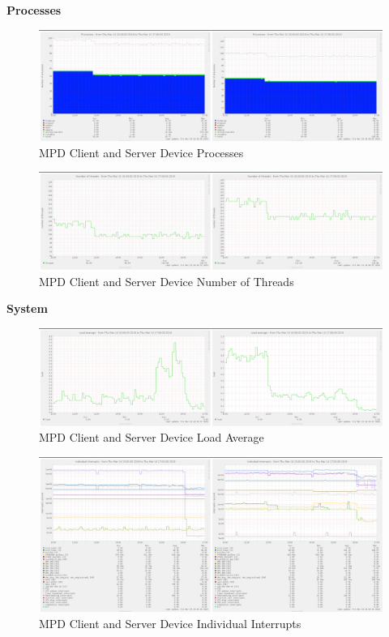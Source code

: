 \documentclass[11pt,a4paper,headinclude=false,footinclude=false]{scrreprt}
\begin{document}
\textbf{Processes}

\begin{figure}[H]
\includegraphics{ResultsAndAnalysis/MPDServerTestImages/019MPDProcesses.png}
\centering
\caption{MPD Client and Server Device Processes}
\label{MPDProcesses}
\end{figure}

\begin{figure}[H]
\includegraphics{ResultsAndAnalysis/MPDServerTestImages/018MPDNoOfThreads.png}
\centering
\caption{MPD Client and Server Device Number of Threads}
\label{MPDNumThreads}
\end{figure}

\textbf{System}

\begin{figure}[H]
\includegraphics{ResultsAndAnalysis/MPDServerTestImages/015MPDLoadAverage.png}
\centering
\caption{MPD Client and Server Device Load Average}
\label{MPDLoadAvg}
\end{figure}

\begin{figure}[H]
\includegraphics{ResultsAndAnalysis/MPDServerTestImages/013MPDIndividualInterrupts.png}
\centering
\caption{MPD Client and Server Device Individual Interrupts}
\label{MPDIndInt}
\end{figure}
\end{document}
